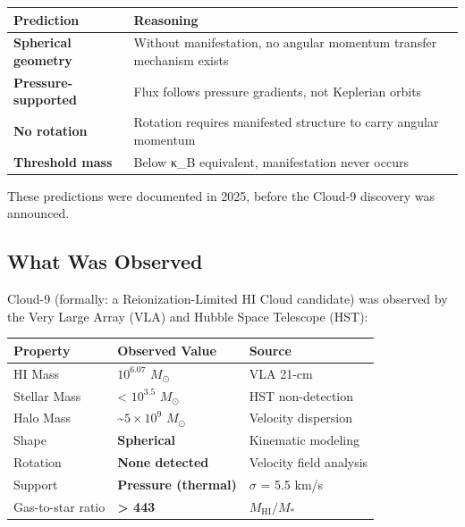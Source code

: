 \documentclass[
  11pt,
  letterpaper,
  twoside,
  openright]{book}
\begin{document}
\begin{longtable}[]{@{}
  >{\raggedright\arraybackslash}p{}
  >{\raggedright\arraybackslash}p{}@{}}
\toprule\noalign{}
\begin{minipage}[b]{\linewidth}\raggedright
Prediction
\end{minipage} & \begin{minipage}[b]{\linewidth}\raggedright
Reasoning
\end{minipage} \\
\midrule\noalign{}
\endhead
\bottomrule\noalign{}
\endlastfoot
\textbf{Spherical geometry} & Without manifestation, no angular momentum
transfer mechanism exists \\
\textbf{Pressure-supported} & Flux follows pressure gradients, not
Keplerian orbits \\
\textbf{No rotation} & Rotation requires manifested structure to carry
angular momentum \\
\textbf{Threshold mass} & Below κ\_B equivalent, manifestation never
occurs \\
\end{longtable}

These predictions were documented in 2025, before the Cloud-9 discovery
was announced.

\subsection{What Was Observed}\label{what-was-observed}

Cloud-9 (formally: a Reionization-Limited HI Cloud candidate) was
observed by the Very Large Array (VLA) and Hubble Space Telescope (HST):

\begin{longtable}[]{@{}lll@{}}
\toprule\noalign{}
Property & Observed Value & Source \\
\midrule\noalign{}
\endhead
\bottomrule\noalign{}
\endlastfoot
HI Mass & \(10^{6.07}\) \(M_\odot\) & VLA 21-cm \\
Stellar Mass & \textless{} \(10^{3.5}\) \(M_\odot\) & HST
non-detection \\
Halo Mass & \textasciitilde{}\(5 \times 10^9\) \(M_\odot\) & Velocity
dispersion \\
Shape & \textbf{Spherical} & Kinematic modeling \\
Rotation & \textbf{None detected} & Velocity field analysis \\
Support & \textbf{Pressure (thermal)} & \(\sigma\) = 5.5 km/s \\
Gas-to-star ratio & \textbf{\textgreater{} 443} &
\(M_{\text{HI}} / M_*\) \\
\end{longtable}
\end{document}

